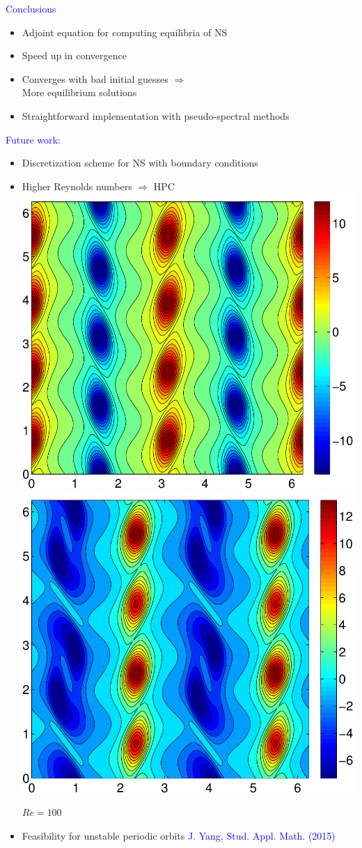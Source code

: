 \documentclass[mathserif]{beamer} %
\begin{document}
%
\begin{frame}
\textcolor{blue}{Conclusions}
\begin{itemize}
\item Adjoint equation for computing equilibria of NS
\item Speed up in convergence
\item Converges with bad initial guesses $\Rightarrow$\\ More equilibrium solutions
\item Straightforward implementation with pseudo-spectral methods
\end{itemize}
\pause\textcolor{blue}{Future work:}
\begin{itemize}
\item Discretization scheme for NS with boundary conditions
\item Higher Reynolds numbers $\Rightarrow$ HPC\\
\centering
\includegraphics[width=.35\textwidth]{Kol_R100_n256_vort_E4-2sin}\hspace{.5cm}
\centering
\includegraphics[width=.35\textwidth]{Kol_R100_n256_vort_E2}
\begin{center}
	$Re=100$
\end{center}
\item Feasibility for unstable periodic orbits {\tiny\textcolor{blue}{J. Yang, 
Stud. Appl. Math. (2015)}}
\end{itemize}
\end{frame}
\end{document}
